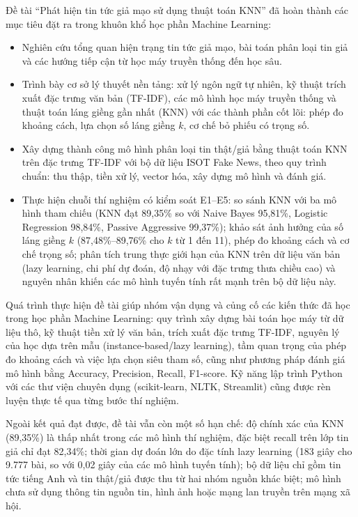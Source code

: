 
Đề tài ``Phát hiện tin tức giả mạo sử dụng thuật toán KNN'' đã hoàn thành các mục tiêu đặt ra trong khuôn khổ học phần Machine Learning:

\begin{itemize}
    \item Nghiên cứu tổng quan hiện trạng tin tức giả mạo, bài toán phân loại tin giả và các hướng tiếp cận từ học máy truyền thống đến học sâu.
    \item Trình bày cơ sở lý thuyết nền tảng: xử lý ngôn ngữ tự nhiên, kỹ thuật trích xuất đặc trưng văn bản (TF-IDF), các mô hình học máy truyền thống và thuật toán láng giềng gần nhất (KNN) với các thành phần cốt lõi: phép đo khoảng cách, lựa chọn số láng giềng $k$, cơ chế bỏ phiếu có trọng số.
    \item Xây dựng thành công mô hình phân loại tin thật/giả bằng thuật toán KNN trên đặc trưng TF-IDF với bộ dữ liệu ISOT Fake News, theo quy trình chuẩn: thu thập, tiền xử lý, vector hóa, xây dựng mô hình và đánh giá.
    \item Thực hiện chuỗi thí nghiệm có kiểm soát E1--E5: so sánh KNN với ba mô hình tham chiếu (KNN đạt 89,35\% so với Naive Bayes 95,81\%, Logistic Regression 98,84\%, Passive Aggressive 99,37\%); khảo sát ảnh hưởng của số láng giềng $k$ (87,48\%--89,76\% cho $k$ từ 1 đến 11), phép đo khoảng cách và cơ chế trọng số; phân tích trung thực giới hạn của KNN trên dữ liệu văn bản (lazy learning, chi phí dự đoán, độ nhạy với đặc trưng thưa chiều cao) và nguyên nhân khiến các mô hình tuyến tính rất mạnh trên bộ dữ liệu này.
\end{itemize}

Quá trình thực hiện đề tài giúp nhóm vận dụng và củng cố các kiến thức đã học trong học phần Machine Learning: quy trình xây dựng bài toán học máy từ dữ liệu thô, kỹ thuật tiền xử lý văn bản, trích xuất đặc trưng TF-IDF, nguyên lý của học dựa trên mẫu (instance-based/lazy learning), tầm quan trọng của phép đo khoảng cách và việc lựa chọn siêu tham số, cũng như phương pháp đánh giá mô hình bằng Accuracy, Precision, Recall, F1-score. Kỹ năng lập trình Python với các thư viện chuyên dụng (scikit-learn, NLTK, Streamlit) cũng được rèn luyện thực tế qua từng bước thí nghiệm.

Ngoài kết quả đạt được, đề tài vẫn còn một số hạn chế: độ chính xác của KNN (89,35\%) là thấp nhất trong các mô hình thí nghiệm, đặc biệt recall trên lớp tin giả chỉ đạt 82,34\%; thời gian dự đoán lớn do đặc tính lazy learning (183 giây cho 9.777 bài, so với 0,02 giây của các mô hình tuyến tính); bộ dữ liệu chỉ gồm tin tức tiếng Anh và tin thật/giả được thu từ hai nhóm nguồn khác biệt; mô hình chưa sử dụng thông tin nguồn tin, hình ảnh hoặc mạng lan truyền trên mạng xã hội.

